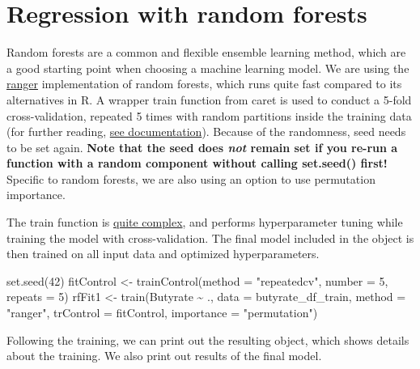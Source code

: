 \documentclass[
  oneside]{book}
\newenvironment{Shaded}{\begin{snugshade}}{\end{snugshade}}
\newcommand{\AttributeTok}[1]{\textcolor[rgb]{0.77,0.63,0.00}{#1}}
\newcommand{\DecValTok}[1]{\textcolor[rgb]{0.00,0.00,0.81}{#1}}
\newcommand{\FunctionTok}[1]{\textcolor[rgb]{0.00,0.00,0.00}{#1}}
\newcommand{\NormalTok}[1]{#1}
\newcommand{\OtherTok}[1]{\textcolor[rgb]{0.56,0.35,0.01}{#1}}
\newcommand{\SpecialCharTok}[1]{\textcolor[rgb]{0.00,0.00,0.00}{#1}}
\newcommand{\StringTok}[1]{\textcolor[rgb]{0.31,0.60,0.02}{#1}}
\begin{document}
\hypertarget{regression-with-random-forests}{%
\section{Regression with random forests}\label{regression-with-random-forests}}

Random forests are a common and flexible ensemble learning method, which are a good starting
point when choosing a machine learning model. We are using the \href{https://github.com/imbs-hl/ranger}{ranger} implementation
of random forests, which runs quite fast compared to its alternatives in R. A wrapper
train function from caret is used to conduct a 5-fold cross-validation, repeated 5 times
with random partitions inside the training data (for further reading, \href{https://topepo.github.io/caret/model-training-and-tuning.html}{see documentation}).
Because of the randomness, seed needs to be set again. \textbf{Note that the seed does \emph{not} remain set if you re-run a function with a random component
without calling set.seed() first!} Specific to random forests, we are also using an option to use permutation
importance.

The train function is \href{https://www.rdocumentation.org/packages/caret/versions/4.47/topics/train}{quite complex}, and performs hyperparameter tuning while training the
model with cross-validation. The final model included in the object is then trained on all
input data and optimized hyperparameters.

\begin{Shaded}
\begin{Highlighting}[]
\FunctionTok{set.seed}\NormalTok{(}\DecValTok{42}\NormalTok{)}
\NormalTok{fitControl }\OtherTok{\textless{}{-}} \FunctionTok{trainControl}\NormalTok{(}\AttributeTok{method =} \StringTok{"repeatedcv"}\NormalTok{, }\AttributeTok{number =} \DecValTok{5}\NormalTok{, }\AttributeTok{repeats =} \DecValTok{5}\NormalTok{)}
\NormalTok{rfFit1 }\OtherTok{\textless{}{-}} \FunctionTok{train}\NormalTok{(Butyrate }\SpecialCharTok{\textasciitilde{}}\NormalTok{ ., }\AttributeTok{data =}\NormalTok{ butyrate\_df\_train, }
                \AttributeTok{method =} \StringTok{"ranger"}\NormalTok{, }
                \AttributeTok{trControl =}\NormalTok{ fitControl,}
                \AttributeTok{importance =} \StringTok{"permutation"}\NormalTok{)}
\end{Highlighting}
\end{Shaded}

Following the training, we can print out the resulting object, which shows details about
the training. We also print out results of the final model.
\end{document}
